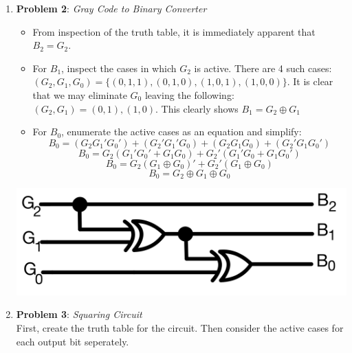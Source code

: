 \documentclass{article}
\begin{document}
\begin{enumerate}
        \item \textbf{Problem 2}: \emph{Gray Code to Binary Converter} \\
            \begin{itemize}
                \item From inspection of the truth table, it is immediately
                apparent that $B_2 = G_2$. 

                \item For $B_1$, inspect the cases in which $G_2$ is active.
                There are 4 such cases: $(G_2, G_1, G_0) = \{(0, 1, 1),
                (0, 1, 0), (1, 0, 1), (1, 0, 0)\}$. It is clear that we may
                eliminate $G_0$ leaving the following: $(G_2, G_1) = {(0, 1),
                (1, 0)}$. This clearly shows $B_1 = G_2 \oplus G_1$

                \item For $B_0$, enumerate the active cases as an equation and
                simplify:
                \[B_0 = (G_2G_1'G_0')+(G_2'G_1'G_0)+(G_2G_1G_0)+(G_2'G_1G_0')\]
                \[B_0 = G_2(G_1'G_0' + G_1G_0)+G_2'(G_1'G_0+G_1G_0')\]
                \[B_0 = G_2(G_1 \oplus G_0)' + G_2'(G_1 \oplus G_0)\]
                \[B_0 = G_2 \oplus G_1 \oplus G_0\]

            \end{itemize}
            \begin{center}
                \includegraphics[scale=0.1]{figs/p2.jpeg}
            \end{center}

        \pagebreak
        \item \textbf{Problem 3}: \emph{Squaring Circuit} \\
        
        First, create the truth table for the circuit. Then consider
        the active cases for each output bit seperately.


\end{enumerate}
\end{document}
